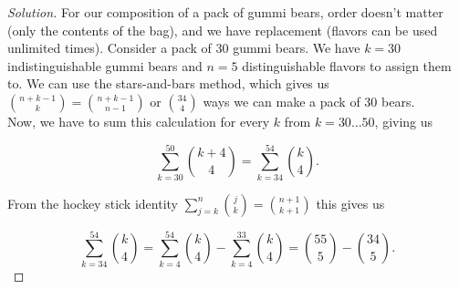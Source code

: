 \documentclass[10pt]{article}
\begin{document}
\begin{proof}[Solution]

For our composition of a pack of gummi bears, order doesn't matter (only the contents of the bag), and we have replacement (flavors can be used unlimited times). Consider a pack of 30 gummi bears. We have $k = 30$ indistinguishable gummi bears and $n = 5$ distinguishable flavors to assign them to. We can use the stars-and-bars method, which gives us \(\binom{n + k -1}{k} = \binom{n + k - 1}{n - 1}\) or \(\binom{34}{4}\) ways we can make a pack of 30 bears. \\

Now, we have to sum this calculation for every $k$ from $k = 30 \ldots 50$, giving us

\[
    \sum^{50}_{k=30}\binom{k + 4}{4} = \sum^{54}_{k=34}\binom{k}{4}.
\]

From the hockey stick identity \(\sum^{n}_{j=k}\binom{j}{k} = \binom{n+1}{k+1}\) this gives us

\[
    \sum^{54}_{k=34}\binom{k}{4} = \sum^{54}_{k=4}\binom{k}{4} - \sum^{33}_{k=4}\binom{k}{4} = \binom{55}{5} - \binom{34}{5}.
\]
\end{proof}
\end{document}
